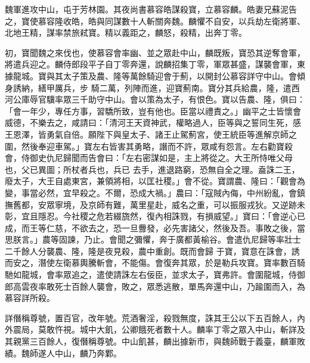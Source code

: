 \begin{pinyinscope}
 魏軍進攻中山，屯于芳林園。其夜尚書慕容皓謀殺寶，立慕容麟。皓妻兄蘇泥告之，寶使慕容隆收皓，皓與同謀數十人斬關奔魏。麟懼不自安，以兵劫左衛將軍、北地王精，謀率禁旅弒寶。精以義距之，麟怒，殺精，出奔丁零。



 初，寶聞魏之來伐也，使慕容會率幽、並之眾赴中山，麟既叛，寶恐其逆奪會軍，將遣兵迎之。麟侍郎段平子自丁零奔還，說麟招集丁零，軍眾甚盛，謀襲會軍，東據龍城。寶與其太子策及農、隆等萬餘騎迎會于薊，以開封公慕容詳守中山。會傾身誘納，繕甲厲兵，步
 騎二萬，列陣而進，迎寶薊南。寶分其兵給農，隆，遣西河公庫辱官驥率眾三千助守中山。會以策為太子，有恨色。寶以告農、隆，俱曰：「會一年少，專任方事，習驕所致，豈有他也。臣當以禮責之。」幽平之士皆懷會威德，不樂去之，咸請曰：「清河王天資神武，權略過人，臣等與之誓同生死，感王恩澤，皆勇氣自倍。願陛下與皇太子、諸王止駕薊宮，使王統臣等進解京師之圍，然後奉迎車駕。」寶左右皆害其勇略，譖而不許，眾咸有怨言。左右勸寶殺會，侍御史仇尼歸聞而告會曰：「左右密謀如是，主上將從之。大王所恃唯父母也，父已異圖；所杖者兵也，兵已
 去手，進退路窮，恐無自全之理。盍誅二王，廢太子，大王自處東宮，兼領將相，以匡社稷。」會不從。寶謂農、隆曰：「觀會為變，事當必然，宜早殺之。不爾，恐成大禍。」農曰：「寇賊內侮，中州紛亂，會鎮撫舊都，安眾寧境，及京師有難，萬里星赴，威名之重，可以振服戎狄。又逆跡未彰，宜且隱忍。今社稷之危若綴旒然，復內相誅戮，有損威望。」寶曰：「會逆心已成，而王等仁慈，不欲去之，恐一旦釁發，必先害諸父，然後及吾。事敗之後，當思朕言。」農等固諫，乃止。會聞之彌懼，奔于廣都黃榆谷。會遣仇尼歸等率壯士二千餘人分襲農、隆，隆是夜見殺，農中重創。既而會歸
 于寶，寶意在誅會，誘而安之，潛使左衛慕輿騰斬會，不能傷。會復奔其眾，於是勒兵攻寶。寶率數百騎馳如龍城，會率眾追之，遣使請誅左右佞臣，並求太子，寶弗許。會圍龍城，侍御郎高雲夜率敢死士百餘人襲會，敗之，眾悉逃散，單馬奔還中山，乃踰圍而入，為慕容詳所殺。



 詳僭稱尊號，置百官，改年號。荒酒奢淫，殺戮無度，誅其王公以下五百餘人，內外震局，莫敢忤視。城中大飢，公卿餓死者數十人。麟率丁零之眾入中山，斬詳及其親黨三百餘人，復僭稱尊號。中山飢甚，麟出據新市，與魏師戰于義臺，麟軍敗績。魏師遂人中山，麟乃奔鄴。




\end{pinyinscope}
